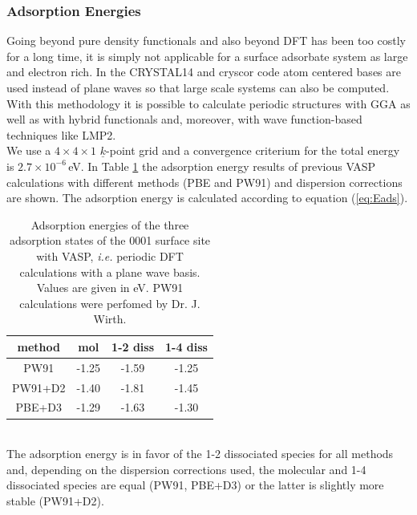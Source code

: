 \documentclass[11pt,DIV=13,BCOR=5mm,a4paper,headinclude]{scrbook}
\renewcommand{\vec}[1]{\underline{#1}}
\begin{document}
\subsubsection{Adsorption Energies}
Going beyond pure density functionals and also beyond DFT has been too costly for a long time, it is simply not applicable for a surface adsorbate system as large and electron rich.
In the CRYSTAL14\cite{crystal14} and cryscor\cite{cryscor} code atom centered bases are used instead of plane waves so that large scale systems can also be computed.
With this methodology it is possible to calculate periodic structures with GGA as well as with hybrid functionals and, moreover, with wave function-based techniques like LMP2.\\
We use a $4\times 4 \times 1$ $\vec{k}$-point grid and a convergence criterium for the total energy is $2.7\times 10^{-6}\,$eV.
In Table \ref{tab:vasp-results} the adsorption energy results of previous VASP calculations with different methods (PBE and PW91) and dispersion corrections are shown.
The adsorption energy is calculated according to equation (\ref{eq:Eads}).
\begin{table}[!h]
  \centering
   \caption{Adsorption energies of the three adsorption states of the 0001 surface site with VASP, \textit{i.e.}
periodic DFT calculations with a plane wave basis.
Values are given in eV.
PW91 calculations were perfomed by Dr. J. Wirth.}
  \begin{tabular}{c|ccc}%
  \toprule
  method & mol & 1-2 diss & 1-4 diss\\\midrule %
  PW91   &-1.25 &-1.59 &-1.25 \\%
  PW91+D2&-1.40 &-1.81 &-1.45 \\%
  PBE+D3 &-1.29&-1.63 &-1.30 \\\bottomrule%
  \end{tabular}
  \label{tab:vasp-results}
 \end{table}
\\

The adsorption energy is in favor of the 1-2 dissociated species for all methods and, depending on the dispersion corrections used, the molecular and 1-4 dissociated species are equal (PW91, PBE+D3) or the latter is slightly more stable (PW91+D2).
\end{document}
